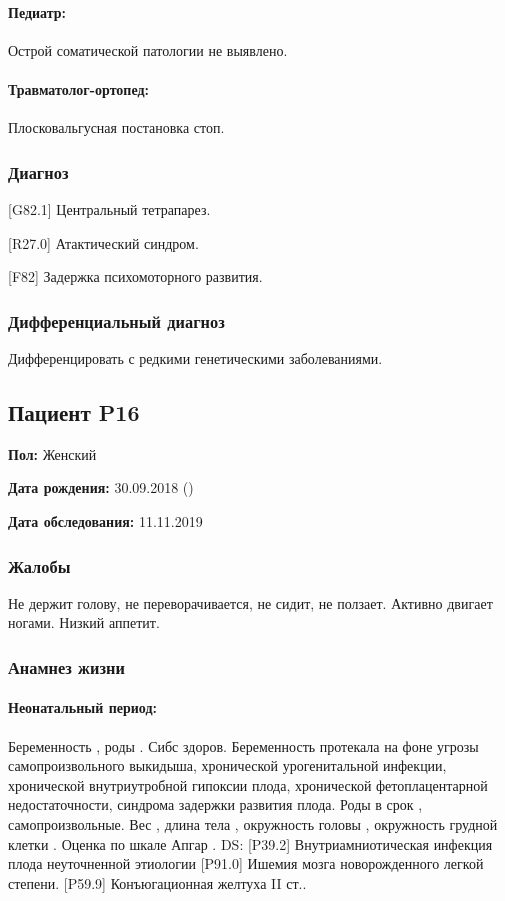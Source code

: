 \documentclass[a4paper,14pt]{extarticle}
\newcommand{\gramm}{г}
\newcommand{\cm}{см}
\newcommand{\weeks}{нед.}
\newcommand{\DS}[2]{[#2] #1}
\begin{document}
\paragraph{Педиатр:} Острой соматической патологии не выявлено.

\paragraph{Травматолог-ортопед:} Плосковальгусная постановка стоп.

\subsubsection*{Диагноз}

\DS{Центральный тетрапарез}{G82.1}.

\DS{Атактический синдром}{R27.0}.

\DS{Задержка психомоторного развития}{F82}.

\subsubsection*{Дифференциальный диагноз}

Дифференцировать с редкими генетическими заболеваниями.

\newpage
\subsection*{Пациент P16}

\textbf{Пол:} Женский

\textbf{Дата рождения:} 30.09.2018 ()

\textbf{Дата обследования:} 11.11.2019

\subsubsection*{Жалобы}

Не держит голову, не переворачивается, не сидит, не ползает. Активно двигает ногами. Низкий аппетит.

\subsubsection*{Анамнез жизни}

\paragraph{Неонатальный период:} Беременность , роды . Сибс здоров. Беременность протекала на фоне угрозы самопроизвольного выкидыша, хронической урогенитальной инфекции, хронической внутриутробной гипоксии плода, хронической фетоплацентарной недостаточности, синдрома задержки развития плода. Роды в срок \numprint[\weeks]{39}, самопроизвольные. Вес \numprint[\gramm]{2860}, длина тела \numprint[\cm]{49}, окружность головы \numprint[\cm]{33}, окружность грудной клетки \numprint[\cm]{30}. Оценка по шкале Апгар . DS: \DS{Внутриамниотическая инфекция плода неуточненной этиологии}{P39.2} \DS{Ишемия мозга новорожденного легкой степени}{P91.0}. \DS{Конъюгационная желтуха II ст.}{P59.9}.
\end{document}
